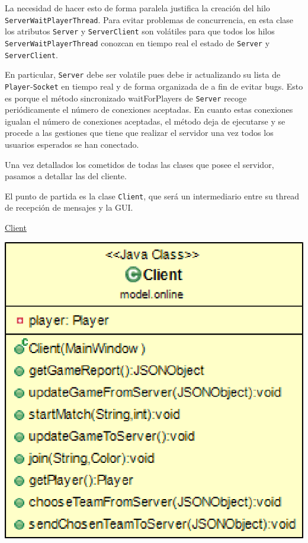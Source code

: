 \documentclass[12pt,a4paper,openright]{book}
\theoremstyle{break}
\begin{document}
La necesidad de hacer esto de forma paralela justifica la creación del hilo \texttt{ServerWaitPlayerThread}. Para evitar problemas de concurrencia, en esta clase los atributos \texttt{Server} y \texttt{ServerClient} son volátiles para que todos los hilos \texttt{ServerWaitPlayerThread} conozcan en tiempo real el estado de \texttt{Server} y \texttt{ServerClient}.

En particular, \texttt{Server} debe ser volatile pues debe ir actualizando su lista de \texttt{Player}-\texttt{Socket} en tiempo real y de forma organizada de a fin de evitar bugs. Esto es porque el método sincronizado waitForPlayers de \texttt{Server} recoge periódicamente el número de conexiones aceptadas. En cuanto estas conexiones igualan el número de conexiones aceptadas, el método deja de ejecutarse y se procede a las gestiones que tiene que realizar el servidor una vez todos los usuarios esperados se han conectado.

Una vez detallados los cometidos de todas las clases que posee el servidor, pasamos a detallar las del cliente.

El punto de partida es la clase \texttt{Client}, que será un intermediario entre su thread de recepción de mensajes y la GUI.

\newpage

\underline{Client}

\begin{center}
\includegraphics[scale=0.3]{Client-sprint7.png} 
\end{center}
\end{document}
